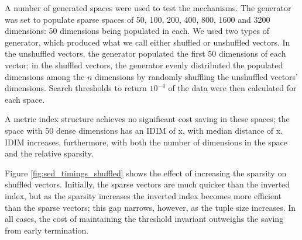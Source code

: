 A number of generated spaces were used to test the mechanisms.  The generator was set to populate sparse spaces of 50, 100, 200, 400, 800, 1600 and 3200 dimensions: 50 dimensions being populated in each.  We used two types of generator, which produced what we call either shuffled or unshuffled vectors.  In the unshuffled vectors, the generator populated the first 50 dimensions of each vector; in the shuffled vectors, the generator evenly distributed the populated dimensions among the $n$ dimensions by randomly shuffling the unshuffled vectors' dimensions. Search thresholds to return $10^{-4}$ of the data were then calculated for each space.

A metric index structure achieves no significant cost saving in these spaces; the space with 50 dense dimensions has an IDIM of x, with median distance of x.  IDIM increases, furthermore, with both the number of dimensions in the space and the relative sparsity.

Figure \ref{fig:sed_timings_shuffled} shows the effect of increasing the sparsity on shuffled vectors.  Initially, the sparse vectors are much quicker than the inverted index, but as the sparsity increases the inverted index becomes more efficient than the sparse vectors; this gap narrows, however, as the tuple size increases.  In all cases, the cost of maintaining the threshold invariant outweighs the saving from early termination.

